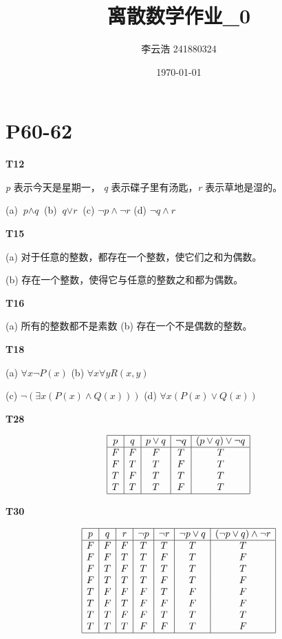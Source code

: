 \documentclass[12pt, a4paper]{ctexart}
\title{离散数学作业\_0}
\author{李云浩 241880324}
\date{\today}
\begin{document}
\maketitle
\section{\textbf{P60-62}}
\textbf{T12}

\textit{p} 表示今天是星期一， \textit{q} 表示碟子里有汤匙，\textit{r} 表示草地是湿的。

(a) $\textit{p} \land \textit{q}$ \quad (b) $\textit{q} \lor \textit{r}$ \quad (c) $\lnot \textit{p} \land \lnot \textit{r}$ \quad (d) $\lnot \textit{q} \land \textit{r}$ 

\textbf{T15}

(a) 对于任意的整数，都存在一个整数，使它们之和为偶数。

(b) 存在一个整数，使得它与任意的整数之和都为偶数。

\textbf{T16}

(a) 所有的整数都不是素数 \quad (b) 存在一个不是偶数的整数。

\textbf{T18}

(a) $\forall x \lnot P(x)$ \quad (b) $\forall x \forall y R(x, y)$

(c) $\lnot(\exists x (P(x) \land Q(x)))$ \quad (d) $\forall x (P(x) \lor Q(x))$

\textbf{T28}

\[
\begin{array}{|c|c|c|c|c|}
    \hline
    p & q & p \lor q & \lnot q & (p \lor q) \lor \lnot q\\
    \hline
    F & F & F & T & T\\
    F & T & T & F & T\\
    T & F & T & T & T\\
    T & T & T & F & T\\
    \hline
\end{array}
\]

\textbf{T30}

\[
\begin{array}{|c|c|c|c|c|c|c|}
    \hline
    p & q & r & \lnot p & \lnot r & \lnot p \lor q & (\lnot p \lor q) \land \lnot r\\
    \hline
    F & F & F & T & T & T & T\\
    F & F & T & T & F & T & F\\
    F & T & F & T & T & T & T\\
    F & T & T & T & F & T & F\\
    T & F & F & F & T & F & F\\
    T & F & T & F & F & F & F\\
    T & T & F & F & T & T & T\\
    T & T & T & F & F & T & F\\
    \hline
\end{array}
\]
\end{document}
